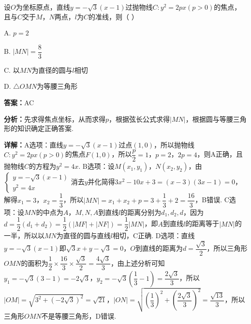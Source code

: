 \begin{question}[points=5]
设$O$为坐标原点，直线$y=-\sqrt{3}(x-1)$过抛物线$C:y^{2}=2px(p>0)$的焦点，且与$C$交于$M$，$N$两点，$l$为$C$的准线，则（ \quad ）
\begin{choices}
  \item A. $p=2$
  \item B. $|MN|=\dfrac{8}{3}$
  \item C. 以$MN$为直径的圆与$l$相切
  \item D. $\triangle OMN$为等腰三角形
\end{choices}
\begin{solution}
\textbf{答案：}AC

\textbf{分析：}先求得焦点坐标，从而求得$p$，根据弦长公式求得$|MN|$，根据圆与等腰三角形的知识确定正确答案.

\textbf{详解：}A选项：直线$y=-\sqrt{3}(x-1)$过点$(1,0)$，所以抛物线$C:y^{2}=2px(p>0)$的焦点$F(1,0)$，所以$\dfrac{p}{2}=1$，$p=2$，$2p=4$，则A正确，且抛物线$C$的方程为$y^{2}=4x$.
B选项：设$M(x_{1},y_{1})$，$N(x_{2},y_{2})$，由$\begin{cases}y=-\sqrt{3}(x-1)\\ y^{2}=4x\end{cases}$消去$y$并化简得$3x^{2}-10x+3=(x-3)(3x-1)=0$，解得$x_{1}=3$，$x_{2}=\dfrac{1}{3}$，所以$|MN|=x_{1}+x_{2}+p=3+\dfrac{1}{3}+2=\dfrac{16}{3}$，B错误.
C选项：设$MN$的中点为$A$，$M,N,A$到直线$l$的距离分别为$d_{1},d_{2},d$，因为$d=\dfrac{1}{2}(d_{1}+d_{2})=\dfrac{1}{2}(|MF|+|NF|)=\dfrac{1}{2}|MN|$，即$A$到直线$l$的距离等于$|MN|$的一半，所以以$MN$为直径的圆与直线$l$相切，C正确.
D选项：直线$y=-\sqrt{3}(x-1)$即$\sqrt{3}x+y-\sqrt{3}=0$，$O$到直线的距离为$d=\dfrac{\sqrt{3}}{2}$，所以三角形$OMN$的面积为$\dfrac{1}{2}\times\dfrac{16}{3}\times\dfrac{\sqrt{3}}{2}=\dfrac{4\sqrt{3}}{3}$，由上述分析可知$y_{1}=-\sqrt{3}(3-1)=-2\sqrt{3}$，$y_{2}=-\sqrt{3}\left(\dfrac{1}{3}-1\right)=\dfrac{2\sqrt{3}}{3}$，所以$|OM|=\sqrt{3^{2}+(-2\sqrt{3})^{2}}=\sqrt{21}$，$|ON|=\sqrt{\left(\dfrac{1}{3}\right)^{2}+\left(\dfrac{2\sqrt{3}}{3}\right)^{2}}=\dfrac{\sqrt{13}}{3}$，所以三角形$OMN$不是等腰三角形，D错误.
\end{solution}
\end{question}

